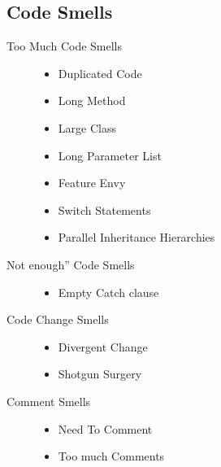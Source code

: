 \documentclass[a4paper,10pt]{article}
\begin{document}
\subsection{Code Smells}
\begin{description}
	\item[Too Much Code Smells] \hfill
		\begin{itemize}
			\item Duplicated Code
			\item Long Method	
			\item Large Class
			\item Long Parameter List
			\item Feature Envy
			\item Switch Statements
			\item Parallel Inheritance Hierarchies
		\end{itemize}
	\item[Not enough” Code Smells] \hfill 
		\begin{itemize}
			\item Empty Catch clause
		\end{itemize}
	\item[Code Change Smells] \hfill
		\begin{itemize}
			\item Divergent Change
			\item Shotgun Surgery	
		\end{itemize}
	\item[Comment Smells] \hfill 
		\begin{itemize}
			\item Need To Comment
			\item Too much Comments
		\end{itemize}
\end{description}

\newpage
\end{document}
